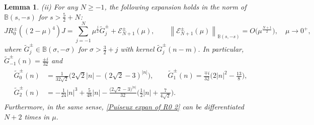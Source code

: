 \documentclass[reqno, 11pt]{amsart}
\newtheorem{lemma}[definition]{Lemma}
\newcommand\B{\mathbb{B}}
\newcommand\mcaE{\mathcal{E}}
\numberwithin{equation}{section}
\begin{document}
\begin{lemma}
\vskip0.2cm
{\rm(ii)}
For any $N\geq-1$, the following expansion holds in the norm of $\B(s,-s)$ for $s>\frac{5}{2}+N$:
\begin{equation}\label{Puiseux expan of R0 2}
JR^{\pm}_0((2-\mu)^4)J=\sum\limits_{j=-1}^{N}\mu^{\frac{j}{2}}\widetilde{G}^{\pm}_j+\mcaE^{\pm}_{N+1}(\mu),\qquad \left\|\mcaE^{\pm}_{N+1}(\mu)\right\|_{\B(s,-s)}=O\big(\mu^{\frac{N+1}{2}}\big),\quad \mu\rightarrow0^+,
\end{equation}
where $\widetilde{G}^{\pm}_j\in\B(\sigma,-\sigma)$ for $\sigma>\frac{3}{2}+j$ with kernel $\widetilde{G}^{\pm}_j(n-m)$. In particular, $\widetilde{G}^{\pm}_{-1}(n)=\frac{\pm i}{32}$ and
\begin{align}\label{expan coeffie of Gtutapm}
\begin{split}
\widetilde{G}^{\pm}_{0}(n)&=\frac{1}{32\sqrt2}\big(2\sqrt2|n|-{(2\sqrt2-3)}^{|n|}\big),\qquad  \widetilde{G}^{\pm}_{1}(n)=\frac{\mp i}{32}\big(2|n|^2-\frac{13}{8}\big),\\
\widetilde{G}^{\pm}_{2}(n)&=-\frac{1}{24}|n|^3+\frac{5}{48}|n|-\frac{\big(2\sqrt2-3\big)^{|n|}}{32}\Big(\frac{1}{2}|n|+\frac{7}{4\sqrt2}\Big).
\end{split}
\end{align}
Furthermore, in the same sense, \eqref{Puiseux expan of R0 2} can be differentiated $N+2$ times in $\mu$.
\end{lemma}
\end{document}
